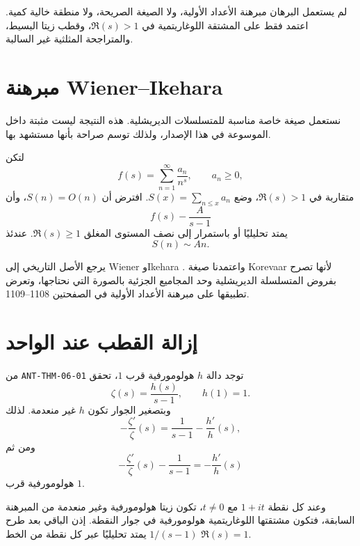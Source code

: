 \begin{remark}
لم يستعمل البرهان مبرهنة الأعداد الأولية، ولا الصيغة الصريحة، ولا منطقة
خالية كمية. اعتمد فقط على المشتقة اللوغاريتمية في \(\Re(s)>1\)، وقطب زيتا
البسيط، والمتراجحة المثلثية غير السالبة.
\end{remark}

\section{مبرهنة Wiener--Ikehara}

نستعمل صيغة خاصة مناسبة للمتسلسلات الديريشلية. هذه النتيجة ليست مثبتة داخل
الموسوعة في هذا الإصدار، ولذلك توسم صراحة بأنها مستشهد بها.

\begin{theorem}
\label{thm:wiener-ikehara-dirichlet-series}
لتكن
\[
f(s)=\sum_{n=1}^{\infty}\frac{a_n}{n^s},
\qquad a_n\ge0,
\]
متقاربة في \(\Re(s)>1\)، وضع \(S(x)=\sum_{n\le x}a_n\). افترض أن
\(S(n)=O(n)\)، وأن
\[
f(s)-\frac{A}{s-1}
\]
يمتد تحليليًا أو باستمرار إلى نصف المستوى المغلق \(\Re(s)\ge1\). عندئذ
\[
S(n)\sim An.
\]
\end{theorem}

يرجع الأصل التاريخي إلى Wiener وIkehara
\cite{Wiener1930,Ikehara1931}. واعتمدنا صيغة Korevaar لأنها تصرح بفروض
المتسلسلة الديريشلية وحد المجاميع الجزئية بالصورة التي نحتاجها، وتعرض
تطبيقها على مبرهنة الأعداد الأولية في الصفحتين 1108--1109.

\section{إزالة القطب عند الواحد}

من \textenglish{\texttt{ANT-THM-06-01}} توجد دالة \(h\) هولومورفية قرب
\(1\)، تحقق
\[
\zeta(s)=\frac{h(s)}{s-1},
\qquad h(1)=1.
\]
وبتصغير الجوار تكون \(h\) غير منعدمة. لذلك
\[
-\frac{\zeta'}{\zeta}(s)
=
\frac1{s-1}-\frac{h'}{h}(s),
\]
ومن ثم
\[
-\frac{\zeta'}{\zeta}(s)-\frac1{s-1}
=-\frac{h'}{h}(s)
\]
هولومورفية قرب \(1\).

وعند كل نقطة \(1+it\) مع \(t\ne0\)، تكون زيتا هولومورفية وغير منعدمة من
المبرهنة السابقة، فتكون مشتقتها اللوغاريتمية هولومورفية في جوار النقطة.
إذن الباقي بعد طرح \(1/(s-1)\) يمتد تحليليًا عبر كل نقطة من الخط
\(\Re(s)=1\).

